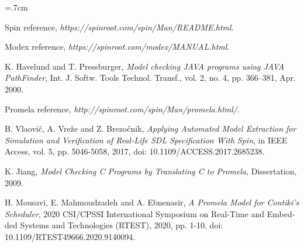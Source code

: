 \renewcommand{\bibname}{مراجع}

\begin{thebibliography}{99}

\begin{latin}

\baselineskip=.7cm

Spin reference, \textit{https://spinroot.com/spin/Man/README.html}.




Modex reference, \textit{https://spinroot.com/modex/MANUAL.html}.

K. Havelund and T. Pressburger, \textit{Model checking JAVA programs using
	JAVA PathFinder}, Int. J. Softw. Tools Technol. Transf., vol. 2, no. 4,
pp. 366–381, Apr. 2000.

Promela reference, \textit{http://spinroot.com/spin/Man/promela.html/}.

B. Vlaovič, A. Vreže and Z. Brezočnik, \textit{Applying Automated Model Extraction for Simulation and Verification of Real-Life SDL Specification With Spin}, in IEEE Access, vol. 5, pp. 5046-5058, 2017, doi: 10.1109/ACCESS.2017.2685238.

K. Jiang, \textit{Model Checking C Programs by Translating C to Promela}, Dissertation, 2009.

H. Mousavi, E. Mahmoudzadeh and A. Ebnenasir, \textit{A Promela Model for Contiki’s Scheduler}, 2020 CSI/CPSSI International Symposium on Real-Time and Embedded Systems and Technologies (RTEST), 2020, pp. 1-10, doi: 10.1109/RTEST49666.2020.9140094.

\end{latin}


\end{thebibliography}